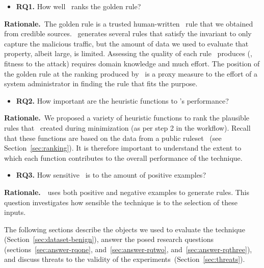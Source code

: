 \documentclass[sigconf,review, anonymous]{acmart}
\begin{document}
\newcommand{\textRQone}{How well \tname\ ranks the golden rule?}
\vspace{0.2cm}
\begin{itemize}[leftmargin=*,label={}]
\item{\textbf{RQ1.}} \textRQone
\end{itemize}

\noindent
\textbf{Rationale.}~The golden rule is a trusted human-written
\nids\ rule that we obtained from credible sources. \tname\ generates
several rules that satisfy the invariant to only capture the malicious
traffic, but the amount of data we used to evaluate that property,
albeit large, is limited. Assessing the quality of each rule
\tname\ produces (\ie{}, fitness to the attack) requires domain
knowledge and much effort. The position of the golden rule at the
ranking produced by \tname\ is a proxy measure to the effort of a
system administrator in finding the rule that fits the purpose.


\newcommand{\textRQtwo}{How important are the heuristic functions
  to \tname's performance?}
\vspace{0.2cm}
\begin{itemize}[leftmargin=*,label={}]
\item{\textbf{RQ2.}} \textRQtwo\
\end{itemize}

\noindent
\textbf{Rationale.}~We proposed a variety of heuristic functions to
rank the plausible rules that \tname\ created during minimization (as
per step 2 in the workflow). Recall that these functions are based on
the data from a public ruleset~\cite{emerging-threats-open} (see
Section~\ref{sec:ranking}). It is therefore important to understand
the extent to which each function contributes to the overall
performance of the technique.

\newcommand{\textRQthree}{How sensitive \tname\ is to the amount of
  positive examples?}
\vspace{0.2cm}
\begin{itemize}[leftmargin=*,label={}]
\item{\textbf{RQ3.}} \textRQthree\
\end{itemize}

\noindent
\textbf{Rationale.}~\tname\ uses both positive and negative examples
to generate rules. This question investigates how sensible the
technique is to the selection of these inputs.
\noindent
\vspace{1ex}

The following sections describe the objects we used to evaluate the
technique (Section~\ref{sec:dataset-benign}), answer the posed
research questions (sections~\ref{sec:answer-rqone},
and~\ref{sec:answer-rqtwo}, and~\ref{sec:answer-rqthree}), and
discuss threats to the validity of the
experiments~(Section~\ref{sec:threats}).
\end{document}
